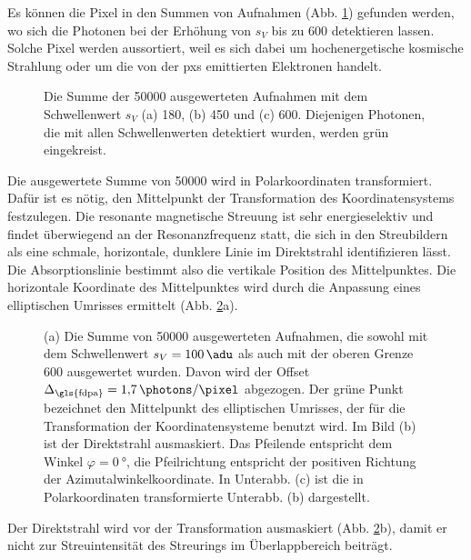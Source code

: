 \noindent
Es können die Pixel in den Summen von Aufnahmen (Abb. \ref{fig:th_180_450_600}) gefunden werden, wo sich die Photonen bei der Erhöhung von $s_V$ bis zu \SI{600}{\adu} detektieren lassen. Solche Pixel werden aussortiert, weil es sich dabei um hochenergetische kosmische Strahlung oder um die von der \gls{pxs} emittierten Elektronen handelt.
\begin{figure}[H]
    \centering
    
    \caption{Die Summe der \num{50000} ausgewerteten Aufnahmen mit dem Schwellenwert $s_V$ (a) \SI{180}{\adu}, (b) \SI{450}{\adu} und (c) \SI{600}{\adu}. Diejenigen Photonen, die mit allen Schwellenwerten detektiert wurden, werden grün eingekreist.}
    \label{fig:th_180_450_600}
\end{figure}
\noindent
Die ausgewertete Summe von \SI{50000}{\captures} wird in Polarkoordinaten transformiert. Dafür ist es nötig, den Mittelpunkt der Transformation des Koordinatensystems festzulegen. Die resonante magnetische Streuung ist sehr energieselektiv und findet überwiegend an der Resonanzfrequenz statt, die sich in den Streubildern als eine schmale, horizontale, dunklere Linie im Direktstrahl identifizieren lässt. Die Absorptionslinie bestimmt also die vertikale Position des Mittelpunktes. Die horizontale Koordinate des Mittelpunktes wird durch die Anpassung eines elliptischen Umrisses ermittelt (Abb. \ref{fig:th-100-200-maske-radial-transform}a).
\begin{figure}[H]
    \centering
    
    \caption{(a) Die Summe von \num{50000} ausgewerteten Aufnahmen, die sowohl mit dem Schwellenwert $s_V = \SI{100}{\adu}$ als auch mit der oberen Grenze \SI{600}{\adu} ausgewertet wurden. Davon wird der Offset $\Delta_\text{\gls{fdpa}} = \SI{1,7}{\photons\per\pixel}$ abgezogen. Der grüne Punkt bezeichnet den Mittelpunkt des elliptischen Umrisses, der für die Transformation der Koordinatensysteme benutzt wird. Im Bild (b) ist der Direktstrahl ausmaskiert. Das Pfeilende entspricht dem Winkel $\varphi = \SI{0}{\degree}$, die Pfeilrichtung entspricht der positiven Richtung der Azimutalwinkelkoordinate. In Unterabb. (c) ist die in Polarkoordinaten transformierte Unterabb. (b) dargestellt.}
    \label{fig:th-100-200-maske-radial-transform}
\end{figure}
\noindent
Der Direktstrahl wird vor der Transformation ausmaskiert (Abb. \ref{fig:th-100-200-maske-radial-transform}b), damit er nicht zur Streuintensität des Streurings im Überlappbereich beiträgt.

